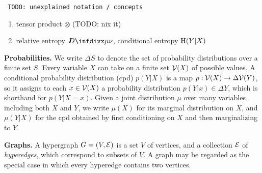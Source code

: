 \documentclass[twoside]{article}
\begin{document}
{\color{red}\tt
TODO: unexplained notation / concepts
\begin{enumerate}[nosep]
\raggedright
\item tensor product $\otimes$  (TODO: nix it)
\item relative entropy $\kldiv\mu\nu$, conditional entropy $\operatorname{\mathrm{H}}(Y|X)$
\end{enumerate}
}

\textbf{Probabilities.}
We write $\Delta S$ to denote the set of probability distributions over a finite set $S$.
Every variable $X$ can take on a finite set $\mathcal V(X)$ of possible values. 
A conditional probability distribution (cpd) $p(Y|X)$ is a map 
$p : \mathcal V(X) \to \Delta \mathcal V(Y)$, so it assigns to each $x \in \mathcal V(X)$ a
probability distribution $p(Y|x) \in \Delta Y$, which is shorthand for
$p(Y|X\!\!=\!x)$. 
Given a joint distribution $\mu$ over many variables including both $X$ and $Y$, 
we write $\mu(X)$ for its marginal distribution on $X$,
and $\mu(Y|X)$ for the cpd obtained by first conditioning on $X$ and then marginalizing to $Y$. 




\textbf{Graphs.}
A hypergraph $G = (V, \mathcal E)$ is a set $V$ of vertices, and a collection
$\mathcal E$ of \emph{hyperedges}, which correspond to subsets of $V$.  
A graph may be regarded as the special case in which every hyperedge
contains two vertices. 
\end{document}
